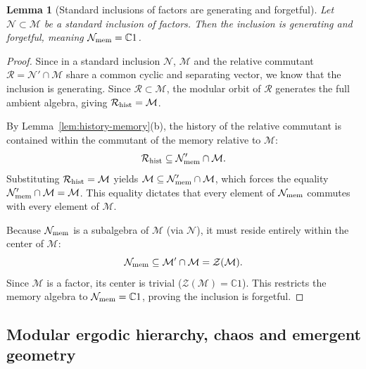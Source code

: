 \documentclass[a4paper,11pt]{article}
\newtheorem{lemma}[theorem]{Lemma}
\theoremstyle{definition}
\newcommand{\mN}{\mathcal{N}}
\newcommand{\mM}{\mathcal{M}}
\begin{document}
\begin{lemma}[Standard inclusions of factors are generating and forgetful]
\label{lem:standard-forgetful}
Let $\mathcal N \subset \mathcal M$ be a standard inclusion of factors. Then the inclusion is generating and forgetful, meaning $\mathcal N_{\rm mem} = \mathbb C1$.
\end{lemma}
\begin{proof}
Since in a standard inclusion $\mN$, $\mM$ and the relative commutant $\mathcal R = \mathcal N' \cap \mathcal M$ share a common cyclic and separating vector, we know that the inclusion is generating. Since $\mathcal R \subset \mathcal M$, the modular orbit of $\mathcal R$ generates the full ambient algebra, giving $\mathcal R_{\rm hist} = \mathcal M$.

By Lemma~\ref{lem:history-memory}(b), the history of the relative commutant is contained within the commutant of the memory relative to $\mathcal M$:
\begin{equation}
    \mathcal R_{\rm hist} \subseteq \mathcal N_{\rm mem}' \cap \mathcal M.
\end{equation}
Substituting $\mathcal R_{\rm hist} = \mathcal M$ yields $\mathcal M \subseteq \mathcal N_{\rm mem}' \cap \mathcal M$, which forces the equality $\mathcal N_{\rm mem}' \cap \mathcal M = \mathcal M$. This equality dictates that every element of $\mathcal N_{\rm mem}$ commutes with every element of $\mathcal M$.

Because $\mathcal N_{\rm mem}$ is a subalgebra of $\mathcal M$ (via $\mathcal N$), it must reside entirely within the center of $\mathcal M$:
\begin{equation}
    \mathcal N_{\rm mem} \subseteq \mathcal M' \cap \mathcal M = \mathcal Z(\mathcal M).
\end{equation}
Since $\mathcal M$ is a factor, its center is trivial ($\mathcal Z(\mathcal M) = \mathbb C1$). This restricts the memory algebra to $\mathcal N_{\rm mem} = \mathbb C1$, proving the inclusion is forgetful.
\end{proof}

\subsection{Modular ergodic hierarchy, chaos and emergent geometry}\label{subsec:QEC-hierarchy}\label{subsec:geometry-modular-ergodic}\label{subsec:geometry-K-systems}
\end{document}
